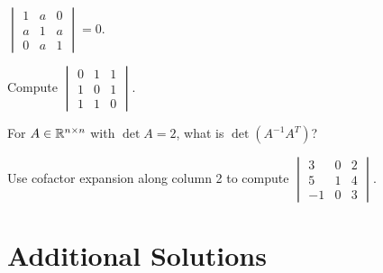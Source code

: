 \begin{problems}
        $\begin{vmatrix} 1 & a & 0 \\ a & 1 & a \\ 0 & a & 1 \end{vmatrix} = 0$.
  \item Compute $\begin{vmatrix} 0 & 1 & 1 \\ 1 & 0 & 1 \\ 1 & 1 & 0 \end{vmatrix}$.
  \item For $A \in \mathbb{R}^{n \times n}$ with $\det A = 2$, what is
        $\det(A^{-1} A^{T})$?
  \item Use cofactor expansion along column 2 to compute
        $\begin{vmatrix} 3 & 0 & 2 \\ 5 & 1 & 4 \\ -1 & 0 & 3 \end{vmatrix}$.
\end{problems}

\section{Additional Solutions}

